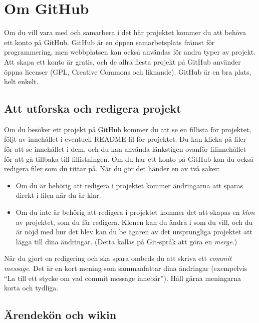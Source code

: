 \section{Om GitHub}

Om du vill vara med och samarbera i det här projektet kommer du att behöva ett konto på GitHub.
GitHub är en öppen samarbetsplats främst för programmering, men webbplatsen kan också användas för andra typer av projekt.
Att skapa ett konto är gratis, och de allra flesta projekt på GitHub använder öppna licenser (GPL, Creative Commons och liknande).
GitHub är en bra plats, helt enkelt.


\subsection{Att utforska och redigera projekt}

Om du besöker ett projekt på GitHub kommer du att se en fillista för projektet, följt av innehållet i eventuell README-fil för projektet.
Du kan klicka på filer för att se innehållet i dem, och du kan använda länkstigen ovanför filinnehållet för att gå tillbaka till fillistningen.
Om du har ett konto på GitHub kan du också redigera filer som du tittar på.
När du gör det händer en av två saker:

\begin{itemize}

\item Om du är behörig att redigera i projektet kommer ändringarna att sparas direkt i filen när du är klar.
\item Om du inte är behörig att redigera i projektet kommer det att skapas en \emph{klon} av projektet, som du får redigera.
Klonen kan du ändra i som du vill, och du är nöjd med hur det blev kan du be ägaren av det ursprungliga projektet att lägga till dina ändringar.
(Detta kallas på Git-språk att göra en \emph{merge}.)

\end{itemize}

När du gjort en redigering och ska spara ombeds du att skriva ett \emph{commit message}.
Det är en kort mening som sammanfattar dina ändringar (exempelvis ``La till ett stycke om vad commit message innebär'').
Håll gärna meningarna korta och tydliga.


\subsection{Ärendekön och wikin}

